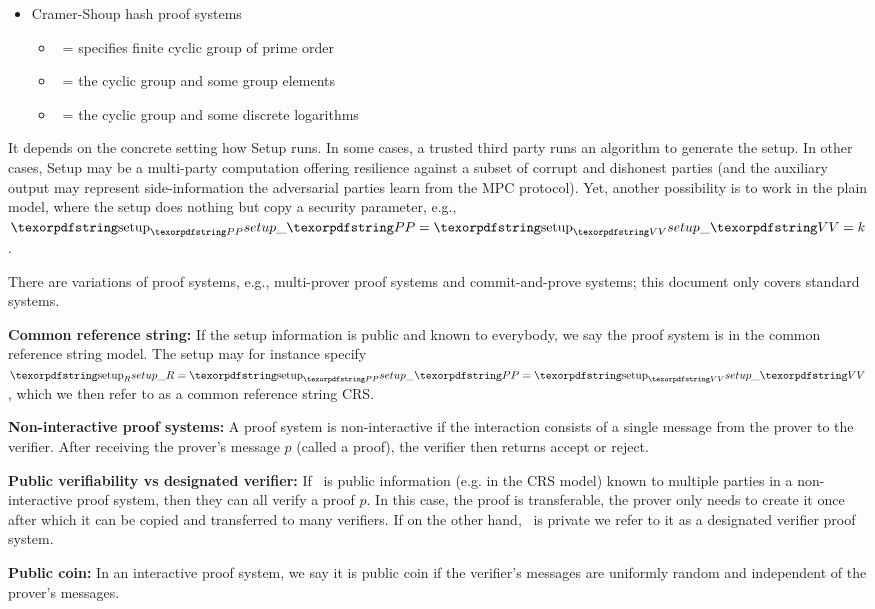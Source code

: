 \begin{itemize}
\item Cramer-Shoup hash proof systems
	\begin{itemize}
	\item \setR\ = specifies finite cyclic group of prime order
	\item \setP\ = the cyclic group and some group elements
	\item \setV\ = the cyclic group and some discrete logarithms
	\end{itemize}

\end{itemize}


It depends on the concrete setting how Setup runs. 
In some cases, a trusted third party runs an algorithm to generate the setup. 
In other cases, Setup may be a multi-party computation offering resilience against a subset of corrupt and dishonest parties (and the auxiliary output may represent side-information the adversarial parties learn from the MPC protocol). 
Yet, another possibility is to work in the plain model, where the setup does nothing but copy a security parameter, e.g., $\setP = \setV = k$.
 
There are variations of proof systems, e.g., multi-prover proof systems and commit-and-prove systems; this document only covers standard systems.
 
\textbf{Common reference string:} If the setup information is public and known to everybody, we say the proof system is in the common reference string model. 
The setup may for instance specify $\setR = \setP = \setV$, which we then refer to as a common reference string CRS.
 
\textbf{Non-interactive proof systems:} 
A proof system is non-interactive if the interaction consists of a single message from the prover to the verifier.
After receiving the prover’s message $p$ (called a proof), the verifier then returns accept or reject.
 
\textbf{Public verifiability vs designated verifier:} 
If \setV\ is public information (e.g. in the CRS model) known to multiple parties in a non-interactive proof system, then they can all verify a proof $p$. 
In this case, the proof is transferable, the prover only needs to create it once after which it can be copied and transferred to many verifiers. 
If on the other hand, \setV\ is private we refer to it as a designated verifier proof system.
 
\textbf{Public coin:} 
In an interactive proof system, we say it is public coin if the verifier’s messages are uniformly random and independent of the prover’s messages.

